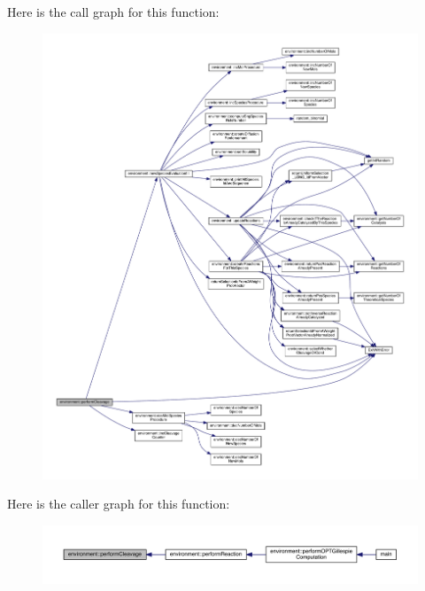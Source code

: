 Here is the call graph for this function\-:\nopagebreak
\begin{figure}[H]
\begin{center}
\leavevmode
\includegraphics[width=350pt]{a00014_aa4ed307a123c402166cfc7f6ed99043a_cgraph}
\end{center}
\end{figure}




Here is the caller graph for this function\-:\nopagebreak
\begin{figure}[H]
\begin{center}
\leavevmode
\includegraphics[width=350pt]{a00014_aa4ed307a123c402166cfc7f6ed99043a_icgraph}
\end{center}
\end{figure}


